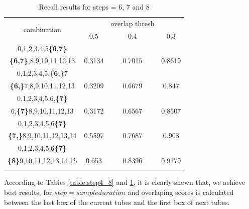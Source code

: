 \documentclass{report}
\begin{document}
\begin{center}
\begin{longtable}{||c||c c c||}

  \hline
  \multirow{2}{5em}{combination} & {} &overlap thresh & {} \\
                                    &   0.5  &  0.4 &  0.3 \\         
  \hline  \hline
  0,1,2,3,4,5\textbf{\{6,7\}}           & {} & {} & {} \\
  \textbf{\{6,7\}},8,9,10,11,12,13      & 0.3134  & 0.7015 & 0.8619 \\
  \hline     \hline                          

  0,1,2,3,4,5,\textbf{\{6,\}}7          & {} & {} & {} \\
  \textbf{\{6,\}}7,8,9,10,11,12,13      & 0.3209  & 0.6679 & 0.847 \\
  \hline                          
  0,1,2,3,4,5,6,\textbf{\{7\}}          & {} & {} & {} \\
  6,\textbf{\{7\}}8,9,10,11,12,13       & 0.3172  & 0.6567 & 0.8507 \\
  \hline                          
  0,1,2,3,4,5,6\textbf{\{7\}}           & {} & {} & {} \\
  \textbf{\{7,\}}8,9,10,11,12,13,14     & 0.5597  & 0.7687 & 0.903 \\
  \hline                           
  0,1,2,3,4,5,6\textbf{\{7\}}           & {} & {} & {} \\
  \textbf{\{8\}}9,10,11,12,13,14,15     & 0.653	  & 0.8396 &0.9179  \\
  \hline                           
  \caption{Recall results for steps = 6, 7 and 8}
  \label{table:step8_678 }
\end{longtable} 
\end{center}

According to Tables \ref{table:step4_8} and \ref{table:step8_678 }, it is clearly shown that, we achieve best results, for $step = sample duration$ and overlaping scores is calculated between the last box of the current tubes and the first box of next tubes.
\end{document}
